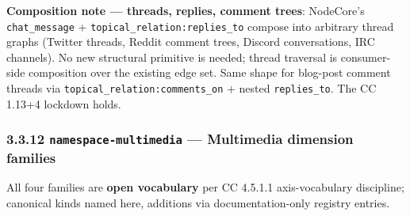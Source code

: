 \documentclass[11pt]{article}
\begin{document}
\textbf{Composition note — threads, replies, comment trees}: NodeCore's \texttt{chat\_message} + \texttt{topical\_relation:replies\_to} compose into arbitrary thread graphs (Twitter threads, Reddit comment trees, Discord conversations, IRC channels). No new structural primitive is needed; thread traversal is consumer-side composition over the existing edge set. Same shape for blog-post comment threads via \texttt{topical\_relation:comments\_on} + nested \texttt{replies\_to}. The CC 1.13+4 lockdown holds.


\subsubsection*{3.3.12 \texttt{namespace-multimedia} — Multimedia dimension families}


All four families are \textbf{open vocabulary} per CC 4.5.1.1 axis-vocabulary discipline; canonical kinds named here, additions via documentation-only registry entries.
\end{document}
